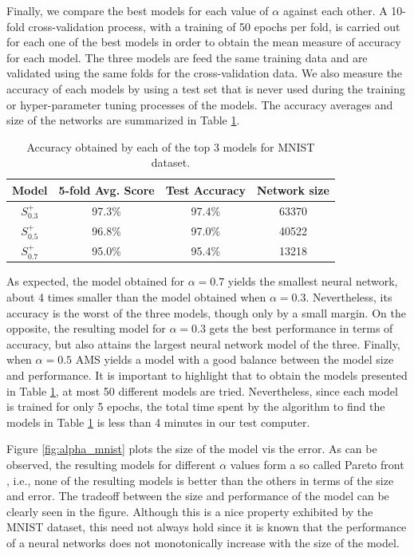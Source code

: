 \documentclass[12pt]{elsart}%
\begin{document}
Finally, we compare the best models for each value of $\alpha$ against each other. A 10-fold cross-validation process, with a training of 50 epochs per fold, is carried out for each one of the best models in order to obtain the mean measure of accuracy for each model. The three models are feed the same training data and are validated using the same folds for the cross-validation data. We also measure the accuracy of each models by using a test set that is never used during the training or hyper-parameter tuning processes of the models. The accuracy averages and size of the networks are summarized in Table \ref{table:avg_accuracies_mnist}. 

\begin{table}[!htb]
\begin{center}
\begin{tabular}{| c | c | c | c |}
\hline
Model & 5-fold Avg. Score & Test Accuracy & Network size\\
\hline
$S^+_{0.3}$ & 97.3\% & 97.4\% & 63370\\
$S^+_{0.5}$ & 96.8\% & 97.0\% & 40522\\
$S^+_{0.7}$ & 95.0\% & 95.4\% & 13218\\
\hline
\end{tabular}
\end{center}
\caption{Accuracy obtained by each of the top 3 models for MNIST dataset.}
\label{table:avg_accuracies_mnist}
\end{table}

As expected, the model obtained for $\alpha = 0.7$ yields the smallest neural network, about 4 times smaller than the model obtained when $\alpha = 0.3$. Nevertheless, its accuracy is the worst of the three models, though only by a small margin. On the opposite, the resulting model for $\alpha = 0.3$ gets the best performance in terms of accuracy, but also attains the largest neural network model of the three. Finally, when $\alpha = 0.5$ AMS yields a model with a good balance between the model size and performance. It is important to highlight that to obtain the models presented in Table \ref{table:avg_accuracies_mnist}, at most 50 different models are tried. Nevertheless, since each model is trained for only 5 epochs, the total time spent by the algorithm to find the models in Table \ref{table:avg_accuracies_mnist} is less than 4 minutes in our test computer. 

Figure \ref{fig:alpha_mnist} plots the size of the model vis the error. As can be observed, the resulting models for different $\alpha$ values form a so called Pareto front \cite{Nocedal06}, i.e., none of the resulting models is better than the others in terms of the size and error. The tradeoff between the size and performance of the model can be clearly seen in the figure. Although this is a nice property exhibited by the MNIST dataset, this need not always hold since it is known that the performance of a neural networks does not monotonically increase with the size of the model. 
\end{document}
